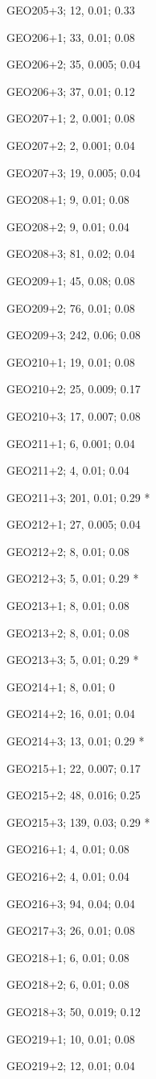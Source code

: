 GEO205+3; 12, 0.01; 0.33

GEO206+1; 33, 0.01; 0.08

GEO206+2; 35, 0.005; 0.04

GEO206+3; 37, 0.01; 0.12

GEO207+1; 2, 0.001; 0.08

GEO207+2; 2, 0.001; 0.04

GEO207+3; 19, 0.005; 0.04

GEO208+1; 9, 0.01; 0.08

GEO208+2; 9, 0.01; 0.04

GEO208+3; 81, 0.02; 0.04

GEO209+1; 45, 0.08; 0.08

GEO209+2; 76, 0.01; 0.08

GEO209+3; 242, 0.06; 0.08

GEO210+1; 19, 0.01; 0.08

GEO210+2; 25, 0.009; 0.17

GEO210+3; 17, 0.007; 0.08

GEO211+1; 6, 0.001; 0.04

GEO211+2; 4, 0.01; 0.04

GEO211+3; 201, 0.01; 0.29 *

GEO212+1; 27, 0.005; 0.04

GEO212+2; 8, 0.01; 0.08

GEO212+3; 5, 0.01; 0.29 *

GEO213+1; 8, 0.01; 0.08

GEO213+2; 8, 0.01; 0.08

GEO213+3; 5, 0.01; 0.29 *

GEO214+1; 8, 0.01; 0

GEO214+2; 16, 0.01; 0.04

GEO214+3; 13, 0.01; 0.29 *

GEO215+1; 22, 0.007; 0.17

GEO215+2; 48, 0.016; 0.25

GEO215+3; 139, 0.03; 0.29 *

GEO216+1; 4, 0.01; 0.08

GEO216+2; 4, 0.01; 0.04

GEO216+3; 94, 0.04; 0.04

GEO217+3; 26, 0.01; 0.08

GEO218+1; 6, 0.01; 0.08

GEO218+2; 6, 0.01; 0.08

GEO218+3; 50, 0.019; 0.12

GEO219+1; 10, 0.01; 0.08

GEO219+2; 12, 0.01; 0.04

